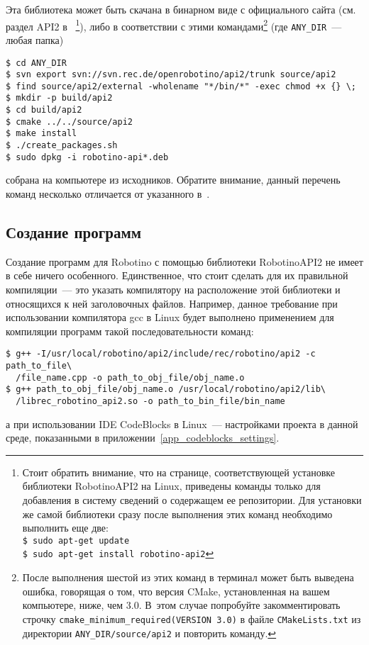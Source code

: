 Эта библиотека может быть скачана в бинарном виде с официального сайта (см. раздел API2 в~\cite{downloads_page}%
\footnote{Стоит обратить внимание, что на странице, соответствующей установке библиотеки RobotinoAPI2 на Linux, приведены команды только для добавления в систему сведений о содержащем ее репозитории. Для установки же самой библиотеки сразу после выполнения этих команд необходимо выполнить еще две:\\
\hspace*{\parindent}\texttt{\$ sudo apt-get update}\\
\hspace*{\parindent}\texttt{\$ sudo apt-get install robotino-api2}
}),
либо в соответствии с этими командами\footnote{После выполнения шестой из этих команд в терминал может быть выведена ошибка, говорящая о том, что версия CMake, установленная на вашем компьютере, ниже, чем 3.0. В~этом случае попробуйте закомментировать строчку \texttt{cmake\_minimum\_required(VERSION 3.0)} в файле \texttt{CMakeLists.txt} из директории \texttt{ANY\_DIR/source/api2} и повторить команду.} (где \texttt{ANY\_DIR}~--- любая папка)
\begin{lstlisting}[style=bash_commands]
$ cd ANY_DIR
$ svn export svn://svn.rec.de/openrobotino/api2/trunk source/api2
$ find source/api2/external -wholename "*/bin/*" -exec chmod +x {} \;
$ mkdir -p build/api2
$ cd build/api2
$ cmake ../../source/api2
$ make install
$ ./create_packages.sh
$ sudo dpkg -i robotino-api*.deb
\end{lstlisting}
собрана на компьютере из исходников.
Обратите внимание, данный перечень команд несколько отличается от указанного в~\cite{api2_source_build}.



\subsection{Создание программ}
Создание программ для Robotino с помощью библиотеки RobotinoAPI2 не имеет в себе ничего особенного.
Единственное, что стоит сделать для их правильной компиляции~--- это указать компилятору на расположение этой библиотеки и относящихся к ней  заголовочных файлов.
Например, данное требование при использовании компилятора gcc в Linux будет выполнено применением для компиляции программ такой последовательности команд:
\begin{lstlisting}[style=bash_commands]
$ g++ -I/usr/local/robotino/api2/include/rec/robotino/api2 -c path_to_file\
  /file_name.cpp -o path_to_obj_file/obj_name.o
$ g++ path_to_obj_file/obj_name.o /usr/local/robotino/api2/lib\
  /librec_robotino_api2.so -o path_to_bin_file/bin_name
\end{lstlisting}
а при использовании IDE CodeBlocks в Linux~--- настройками проекта в данной среде, показанными в приложении~\ref{app_codeblocks_settings}.

